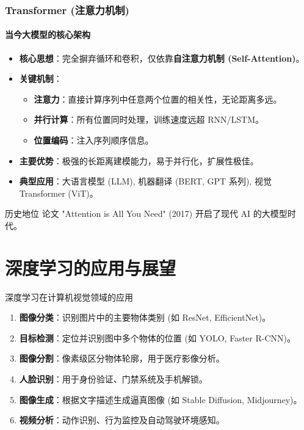 \documentclass[12pt, t, aspectratio=169]{beamer}
\begin{document}
\begin{frame}
    \frametitle{Transformer (注意力机制)}
    \framesubtitle{当今大模型的核心架构}
    
    \begin{itemize}
        \item \textbf{核心思想}：完全摒弃循环和卷积，仅依靠\textbf{自注意力机制 (Self-Attention)}。
        \item \textbf{关键机制}：
        \begin{itemize}
            \item \textbf{注意力}：直接计算序列中任意两个位置的相关性，无论距离多远。
            \item \textbf{并行计算}：所有位置同时处理，训练速度远超 RNN/LSTM。
            \item \textbf{位置编码}：注入序列顺序信息。
        \end{itemize}
        \item \textbf{主要优势}：极强的长距离建模能力，易于并行化，扩展性极佳。
        \item \textbf{典型应用}：大语言模型 (LLM), 机器翻译 (BERT, GPT 系列), 视觉 Transformer (ViT)。
    \end{itemize}
    
    \begin{block}{历史地位}
        论文 "Attention is All You Need" (2017) 开启了现代 AI 的大模型时代。
    \end{block}
\end{frame}

\section{深度学习的应用与展望}

\begin{frame}{深度学习在计算机视觉领域的应用}
    \begin{enumerate}
        \item \textbf{图像分类}：识别图片中的主要物体类别 (如 ResNet, EfficientNet)。
        \item \textbf{目标检测}：定位并识别图中多个物体的位置 (如 YOLO, Faster R-CNN)。
        \item \textbf{图像分割}：像素级区分物体轮廓，用于医疗影像分析。
        \item \textbf{人脸识别}：用于身份验证、门禁系统及手机解锁。
        \item \textbf{图像生成}：根据文字描述生成逼真图像 (如 Stable Diffusion, Midjourney)。
        \item \textbf{视频分析}：动作识别、行为监控及自动驾驶环境感知。
    \end{enumerate}
\end{frame}
\end{document}
